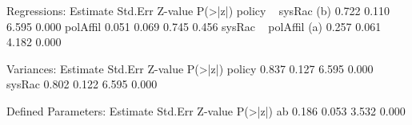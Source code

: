\begin{Schunk}
\begin{Soutput}
Regressions:
                   Estimate  Std.Err  Z-value  P(>|z|)
  policy ~                                            
    sysRac     (b)    0.722    0.110    6.595    0.000
    polAffil          0.051    0.069    0.745    0.456
  sysRac ~                                            
    polAffil   (a)    0.257    0.061    4.182    0.000

Variances:
                   Estimate  Std.Err  Z-value  P(>|z|)
    policy            0.837    0.127    6.595    0.000
    sysRac            0.802    0.122    6.595    0.000

Defined Parameters:
                   Estimate  Std.Err  Z-value  P(>|z|)
    ab                0.186    0.053    3.532    0.000
\end{Soutput}
\end{Schunk}
